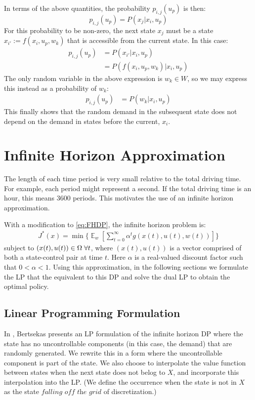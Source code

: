 \documentclass[conference]{IEEEtran}
\DeclareMathOperator{\E}{\mathbb{E}}
\begin{document}
In terms of the above quantities, the probability $p_{i,j}(u_{p})$ is then: 
\begin{displaymath}
p_{i,j}(u_{p})= P(x_{j}| x_{i},u_{p})
\end{displaymath} For this probability to be non-zero, the next state $x_{j}$ must be a state $x_{i'}:=f(x_{i},u_{p},w_{k})$ that is accessible from the current state. In this case:
\begin{align*} 
p_{i,j}(u_{p})&= P(x_{i'}| x_{i},u_{p})\\ 
&= P(f(x_{i},u_{p},w_{k})| x_{i},u_{p})
\end{align*} The only random variable in the above expression is $w_{k}\in W$, so we may express this instead as a probability of $w_{k}$:
\begin{align*} 
p_{i,j}(u_{p})&= P(w_{k} | x_{i},u_{p})
\end{align*} This finally shows that the random demand in the subsequent state does not depend on the demand in states before the current, $x_{i}$. 



\section{Infinite Horizon Approximation}
The length of each time period is very small relative to the total driving time. For example, each period might represent a second. If the total driving time is an hour, this means 3600 periods. This motivates the use of an infinite horizon approximation.

With a modification to \eqref{eq:FHDP}, the infinite horizon problem is:
\begin{multline} \label{eq:DP}
J^{*}(x)= \min\Biggl\{\mathop{\E}_{w}\left[\sum_{t=0}^{\infty}\alpha^{t}g(x(t),u(t),w(t))\right]\Biggr\}
\end{multline} subject to $(x(t),u(t))\in\Omega \hspace{0.1cm}\forall t$, where $(x(t),u(t))$ is a vector comprised of both a state-control pair at time $t$. Here $\alpha$ is a real-valued discount factor such that $0<\alpha<1$. Using this approximation, in the following sections we formulate the LP that the equivalent to this DP and solve the dual LP to obtain the optimal policy.


\subsection{Linear Programming Formulation}
In \cite{Bertsekas:2007:DPO:1396348}, Bertsekas presents an LP formulation of the infinite horizon DP where the state has no uncontrollable components (in this case, the demand) that are randomly generated. We rewrite this in a form where the uncontrollable component is part of the state. We also choose to interpolate the value function between states when the next state does not belog to $X$, and incorporate this interpolation into the LP. (We define the occurrence when the state is not in $X$ as the state $\textit{falling off the grid}$ of discretization.)
\end{document}
